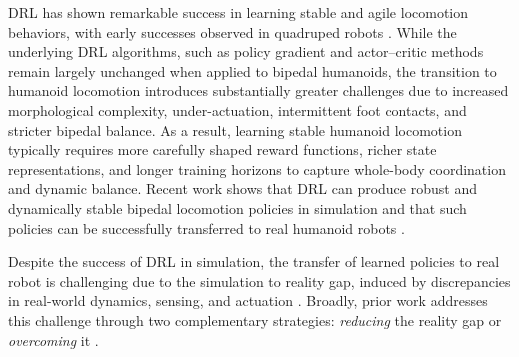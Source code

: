 DRL has shown remarkable success in learning stable and agile locomotion behaviors, with early successes observed in quadruped robots \citep{doi:10.1126/scirobotics.aau5872, doi:10.1126/scirobotics.abc5986, tan2018simtoreallearningagilelocomotion}. While the underlying DRL algorithms, such as policy gradient and actor–critic methods remain largely unchanged when applied to bipedal humanoids, the transition to humanoid locomotion introduces substantially greater challenges due to increased morphological complexity, under-actuation, intermittent foot contacts, and stricter bipedal balance. As a result, learning stable humanoid locomotion typically requires more carefully shaped reward functions, richer state representations, and longer training horizons to capture whole-body coordination and dynamic balance. Recent work shows that DRL can produce robust and dynamically stable bipedal locomotion policies in simulation and that such policies can be successfully transferred to real humanoid robots \citep{gu2024humanoidgymreinforcementlearninghumanoid, doi:10.1126/scirobotics.adi9579, Singh_2024}.

Despite the success of DRL in simulation, the transfer of learned policies to real robot is challenging due to the simulation to reality gap, induced by discrepancies in real-world dynamics, sensing, and actuation \citep{10.1007/3-540-59496-5_337}. Broadly, prior work addresses this challenge through two complementary strategies: \emph{reducing} the reality gap or \emph{overcoming} it \citep{aljalbout2025realitygaproboticschallenges}.



